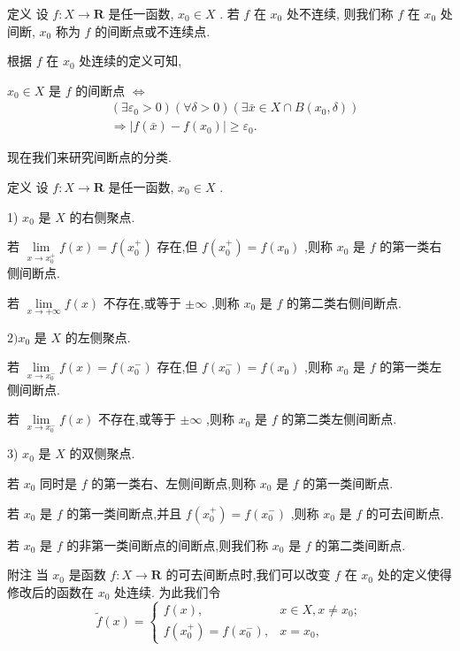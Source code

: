 定义 设 $f : X \rightarrow  \mathbf{R}$ 是任一函数, ${x}_{0} \in  X$ . 若 $f$ 在 ${x}_{0}$ 处不连续, 则我们称 $f$ 在 ${x}_{0}$ 处间断, ${x}_{0}$ 称为 $f$ 的间断点或不连续点.

根据 $f$ 在 ${x}_{0}$ 处连续的定义可知,

${x}_{0} \in  X$ 是 $f$ 的间断点 $\Leftrightarrow$
\begin{align*}
	&\left( {\exists {\varepsilon }_{0} > 0}\right) \left( {\forall \delta  > 0}\right) \left( {\exists \bar{x} \in  X \cap  B\left( {{x}_{0},\delta }\right) }\right)\\
	&\Rightarrow  \left| {f\left( \bar{x}\right)  - f\left( {x}_{0}\right) }\right|  \geq  {\varepsilon }_{0}.
\end{align*}

现在我们来研究间断点的分类.

定义 设 $f : X \rightarrow  \mathbf{R}$ 是任一函数, ${x}_{0} \in  X$ .

1) ${x}_{0}$ 是 $X$ 的右侧聚点.

若 $\mathop{\lim }\limits_{{x \rightarrow  {x}_{0}^{ + }}}f\left( x\right)  = f\left( {x}_{0}^{ + }\right)$ 存在,但 $f\left( {x}_{0}^{ + }\right)  = f\left( {x}_{0}\right)$ ,则称 ${x}_{0}$ 是 $f$ 的第一类右侧间断点.

若 $\mathop{\lim }\limits_{{x \rightarrow   + \infty }}f\left( x\right)$ 不存在,或等于 $\pm  \infty$ ,则称 ${x}_{0}$ 是 $f$ 的第二类右侧间断点.

$2){x}_{0}$ 是 $X$ 的左侧聚点.

若 $\mathop{\lim }\limits_{{x \rightarrow  {x}_{0}^{ - }}}f\left( x\right)  = f\left( {x}_{0}^{ - }\right)$ 存在,但 $f\left( {x}_{0}^{ - }\right)  = f\left( {x}_{0}\right)$ ,则称 ${x}_{0}$ 是 $f$ 的第一类左侧间断点.

若 $\mathop{\lim }\limits_{{x \rightarrow  {x}_{0}^{ - }}}f\left( x\right)$ 不存在,或等于 $\pm  \infty$ ,则称 ${x}_{0}$ 是 $f$ 的第二类左侧间断点.

3) ${x}_{0}$ 是 $X$ 的双侧聚点.

若 ${x}_{0}$ 同时是 $f$ 的第一类右、左侧间断点,则称 ${x}_{0}$ 是 $f$ 的第一类间断点.

若 ${x}_{0}$ 是 $f$ 的第一类间断点,并且 $f\left( {x}_{0}^{ + }\right)  = f\left( {x}_{0}^{ - }\right)$ ,则称 ${x}_{0}$ 是 $f$ 的可去间断点.

若 ${x}_{0}$ 是 $f$ 的非第一类间断点的间断点,则我们称 ${x}_{0}$ 是 $f$ 的第二类间断点.

附注 当 ${x}_{0}$ 是函数 $f : X \rightarrow  \mathbf{R}$ 的可去间断点时,我们可以改变 $f$ 在 ${x}_{0}$ 处的定义使得修改后的函数在 ${x}_{0}$ 处连续. 为此我们令
$$\widetilde{f}\left( x\right)  = \left\{  \begin{array}{ll} f\left( x\right) , & x \in  X,x \neq  {x}_{0}; \\  f\left( {x}_{0}^{ + }\right)  = f\left( {x}_{0}^{ - }\right) , & x = {x}_{0}, \end{array}\right.$$

